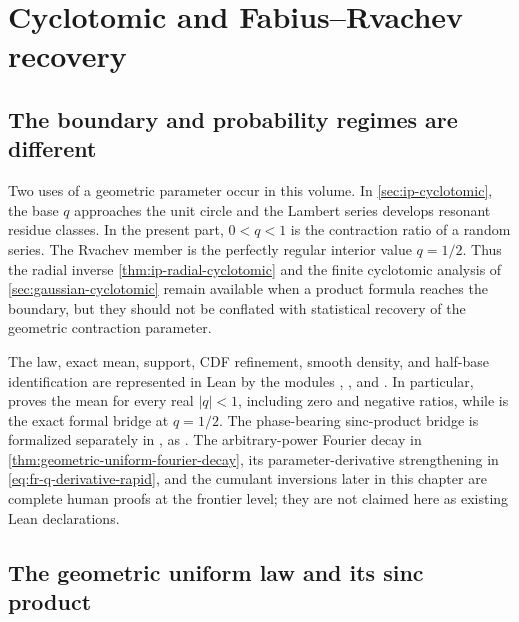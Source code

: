 \chapter{Cyclotomic and Fabius--Rvachev recovery}
\label{chap:cyclotomic-fabius-recovery}

\section{The boundary and probability regimes are different}
\label{sec:cyclotomic-fabius-interface}

Two uses of a geometric parameter occur in this volume.  In
\cref{sec:ip-cyclotomic}, the base \(q\) approaches the unit circle and the
Lambert series develops resonant residue classes.  In the present part,
\(0<q<1\) is the contraction ratio of a random series.  The Rvachev member is
the perfectly regular interior value \(q=1/2\).  Thus the radial inverse
\cref{thm:ip-radial-cyclotomic} and the finite cyclotomic analysis of
\cref{sec:gaussian-cyclotomic} remain available when a product formula reaches
the boundary, but they should not be conflated with statistical recovery of
the geometric contraction parameter.

The law, exact mean, support, CDF refinement, smooth density, and half-base
identification are represented in Lean by the modules
,
, and
.  In particular,
 proves the mean
for every real \(\lvert q\rvert<1\), including zero and negative ratios, while
 is the exact formal bridge
at \(q=1/2\).  The phase-bearing sinc-product bridge is formalized separately
in , as
.
The arbitrary-power Fourier decay in
\cref{thm:geometric-uniform-fourier-decay}, its
parameter-derivative strengthening in \cref{eq:fr-q-derivative-rapid}, and the
cumulant inversions later in this chapter are complete human proofs at the
frontier level; they are not claimed here as existing Lean declarations.

\section{The geometric uniform law and its sinc product}
\label{sec:fr-geometric-law}

